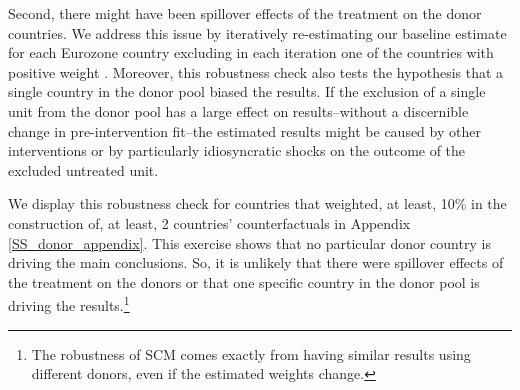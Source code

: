 \documentclass[12pt]{article}
\begin{document}
Second, there might have been spillover effects of the treatment on the donor countries. We address this issue by iteratively re-estimating our baseline estimate for each Eurozone country excluding in each iteration one of the countries with positive weight \citep{Abadie2015}. Moreover, this robustness check also tests the hypothesis that a single country in the donor pool biased the results. If the exclusion of a single unit from the donor pool has a large effect on results--without a discernible change in pre-intervention fit--the estimated results might be caused by other interventions or by particularly idiosyncratic shocks on the outcome of the excluded untreated unit.

We display this robustness check for countries that weighted, at least, 10\% in the construction of, at least, 2 countries' counterfactuals in Appendix \ref{SS_donor_appendix}. This exercise shows that no particular donor country is driving the main conclusions. So, it is unlikely that there were spillover effects of the treatment on the donors or that one specific country in the donor pool is driving the results.\footnote{The robustness of SCM comes exactly from having similar results using different donors, even if the estimated weights change.}



\end{document}
